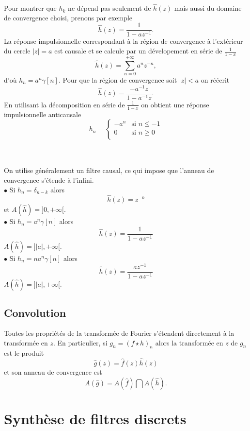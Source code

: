 Pour montrer que
$h_k$ ne d\'epend pas seulement de
$\hat h(z)$ mais aussi du domaine de convergence choisi,
prenons par exemple
\[
\hat h(z) = \frac 1 {1 - a z^{-1}} .
\]
La r\'eponse impulsionnelle correspondant \`a la r\'egion de
convergence \`a l'ext\'erieur du cercle
$|z| = a$ est causale et se calcule par un d\'evelopement
en s\'erie de $\frac 1 {1 - x}$
\[
\hat h(z) = \sum_{n=0}^{+\infty} a^n z^{-n} ,
\]
d'o\`u $h_n = a^n \gamma[n]$.
Pour que la r\'egion de convergence soit $|z| < a$ on
r\'e\'ecrit
\[
\hat h(z) = \frac {-a^{-1} z} {1 - a^{-1}z} .
\]
En utilisant la d\'ecomposition en s\'erie de $\frac 1 {1-x}$
on obtient une r\'eponse impulsionnelle anticausale
\[
h_n = \left\{
\begin{array}{ll}
-a^n & \mbox{si $n \leq -1$}\\
0 & \mbox{si $n \geq 0$}\\
\end{array}
\right.
\]
\\
\\
\begin{example}
On utilise g\'en\'eralement un filtre causal, ce qui
impose que l'anneau de convergence s'\'etende \`a l'infini.\\
$\bullet$ Si $h_n = \delta _{n-k}$ alors
\begin{equation}
\label{transl-z}
\hat h(z) = z^{-k}
\end{equation}
et $A(\hat h) = ]0 , +\infty [$.\\
$\bullet$ Si $h_n = a^n \gamma [n]$ alors
\begin{equation}
\label{un-pole2}
\hat h(z) = \frac 1 {1 - a z^{-1}}
\end{equation}
$A(\hat h) = ]|a| , +\infty [$.\\
$\bullet$ Si $h_n = n a^n \gamma [n]$ alors
\[
\hat h(z) = \frac {a z^{-1}} {1 - a z^{-1}}
\]
$A(\hat h) = ]|a| , +\infty [$.
\end{example}

\subsection{Convolution}
Toutes les propri\'et\'es de la transform\'ee
de Fourier s'\'etendent directement
\`a la transform\'ee en $z$.
En particulier, si $g_n = (f \star h)_n$ alors la transform\'ee
en $z$ de $g_n$ est le produit
\[
\hat g(z) = \hat f(z) \hat h(z)
\]
et son anneau de convergence est
\[
A(\hat g) = A(\hat f ) \bigcap A(\hat h ) .
\]


\section{Synth\`ese de filtres discrets}

